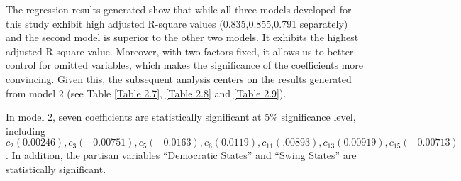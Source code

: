 



The regression results generated show that while all three models developed for this study exhibit high adjusted R-square values (0.835,0.855,0.791 separately) and the second model is superior to the other two models. It exhibits the highest adjusted R-square value. Moreover, with two factors
fixed, it allows us to better control for omitted variables, which makes the significance of the coefficients more convincing. Given this, the subsequent analysis centers on the results generated from model 2 (see Table \ref{Table 2.7}, \ref{Table 2.8} and \ref{Table 2.9}).


In model 2, seven coefficients are statistically significant at 5\% significance level, including $c_2(0.00246), c_3(-0.00751), c_5(-0.0163),c_6(0.0119), c_{11}(.00893), c_{13}(0.00919), c_{15}(-0.00713)$. In addition, the partisan variables “Democratic States” and “Swing States” are statistically significant.

